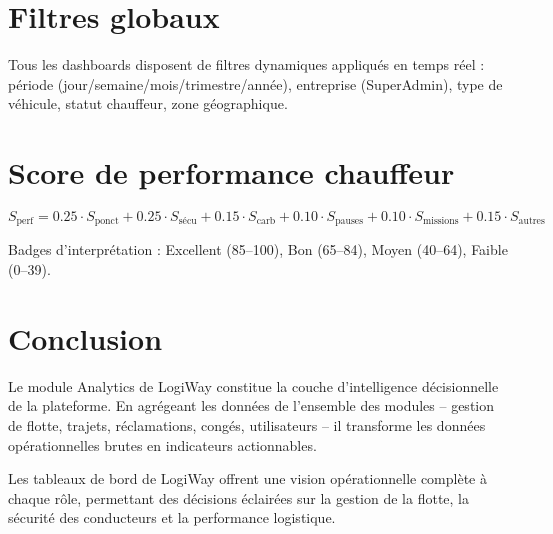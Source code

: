 \documentclass[12pt,a4paper]{report}
\begin{document}
\section{Filtres globaux}
\label{sec:ch8-filtres}

Tous les dashboards disposent de filtres dynamiques appliqués en temps réel :
période (jour/semaine/mois/trimestre/année), entreprise (SuperAdmin),
type de véhicule, statut chauffeur, zone géographique.

\section{Score de performance chauffeur}
\label{sec:ch8-score}

\begin{tcolorbox}[ruleframe]
\[
  S_{\text{perf}} = 0.25 \cdot S_{\text{ponct}} + 0.25 \cdot S_{\text{sécu}}
  + 0.15 \cdot S_{\text{carb}} + 0.10 \cdot S_{\text{pauses}}
  + 0.10 \cdot S_{\text{missions}} + 0.15 \cdot S_{\text{autres}}
\]
\end{tcolorbox}

Badges d'interprétation : Excellent (85--100), Bon (65--84),
Moyen (40--64), Faible (0--39).

\section{Conclusion}
\label{sec:ch8-conclusion}

Le module Analytics de LogiWay constitue la couche d'intelligence
décisionnelle de la plateforme. En agrégeant les données de l'ensemble
des modules -- gestion de flotte, trajets, réclamations, congés,
utilisateurs -- il transforme les données opérationnelles brutes en
indicateurs actionnables.

Les tableaux de bord de LogiWay offrent une vision opérationnelle complète
à chaque rôle, permettant des décisions éclairées sur la gestion de la
flotte, la sécurité des conducteurs et la performance logistique.
\end{document}

